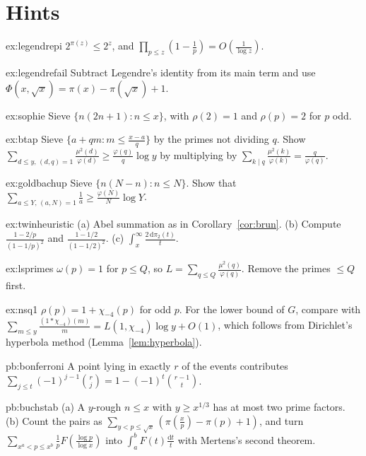 \section{Hints}

\begin{hint}{ex:legendrepi}
$2^{\pi(z)}\le2^z$, and $\prod_{p\le z}(1-\frac1p)=O(\frac1{\log z})$.
\end{hint}
\begin{hint}{ex:legendrefail}
Subtract Legendre's identity from its main term and use $\Phi(x,\sqrt x)=\pi(x)-\pi(\sqrt x)+1$.
\end{hint}
\begin{hint}{ex:sophie}
Sieve $\{n(2n+1):n\le x\}$, with $\rho(2)=1$ and $\rho(p)=2$ for $p$ odd.
\end{hint}
\begin{hint}{ex:btap}
Sieve $\{a+qm:m\le\frac{x-a}q\}$ by the primes not dividing $q$. Show $\sum_{d\le y,\,(d,q)=1}\frac{\mu^2(d)}{\varphi(d)}\ge\frac{\varphi(q)}q\log y$ by multiplying by $\sum_{k\mid q}\frac{\mu^2(k)}{\varphi(k)}=\frac q{\varphi(q)}$.
\end{hint}
\begin{hint}{ex:goldbachup}
Sieve $\{n(N-n):n\le N\}$. Show that $\sum_{a\le Y,\,(a,N)=1}\frac1a\ge\frac{\varphi(N)}N\log Y$.
\end{hint}
\begin{hint}{ex:twinheuristic}
(a) Abel summation as in Corollary~\ref{cor:brun}. (b) Compute $\frac{1-2/p}{(1-1/p)^2}$ and $\frac{1-1/2}{(1-1/2)^2}$. (c) $\int_x^\infty\frac{2\,\mathrm d\pi_2(t)}t$.
\end{hint}
\begin{hint}{ex:lsprimes}
$\omega(p)=1$ for $p\le Q$, so $L=\sum_{q\le Q}\frac{\mu^2(q)}{\varphi(q)}$. Remove the primes $\le Q$ first.
\end{hint}
\begin{hint}{ex:nsq1}
$\rho(p)=1+\chi_{-4}(p)$ for odd $p$. For the lower bound of $G$, compare with $\sum_{m\le y}\frac{(1*\chi_{-4})(m)}m=L(1,\chi_{-4})\log y+O(1)$, which follows from Dirichlet's hyperbola method (Lemma~\ref{lem:hyperbola}).
\end{hint}

\begin{hint}{pb:bonferroni}
A point lying in exactly $r$ of the events contributes $\sum_{j\le t}(-1)^{j-1}\binom rj=1-(-1)^t\binom{r-1}t$.
\end{hint}

\begin{hint}{pb:buchstab}
(a) A $y$-rough $n\le x$ with $y\ge x^{1/3}$ has at most two prime factors. (b) Count the pairs as $\sum_{y<p\le\sqrt x}(\pi(\frac xp)-\pi(p)+1)$, and turn
$\sum_{x^a<p\le x^b}\frac1pF(\frac{\log p}{\log x})$ into $\int_a^bF(t)\frac{\mathrm dt}t$ with Mertens's second theorem.
\end{hint}

